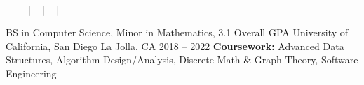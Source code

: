 \documentclass[]{awesome-cv}
\begin{document}
\begin{center}
	\vspace{-5mm}
	  \\
	\vspace{2mm}
  \faEnvelope\  |
  \faMobile\  |
  \faLink\  |
  \faGithub\  |
  \faLinkedinSquare\ 
\end{center}
\vspace{-3mm}
\begin{cventries}
	\cventry
	{BS in Computer Science, Minor in Mathematics, 3.1 Overall GPA}
	{University of California, San Diego}
	{La Jolla, CA}
	{2018 – 2022}
  {\textbf{Coursework:} Advanced Data Structures, Algorithm Design/Analysis,
  Discrete Math \& Graph Theory, Software Engineering}
\end{cventries}
\end{document}
